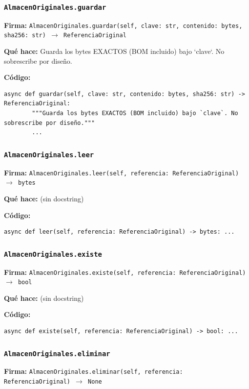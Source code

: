 \documentclass[11pt,a4paper]{article}
\begin{document}
\subsubsection*{\texttt{AlmacenOriginales.guardar}}
\textbf{Firma:} \texttt{AlmacenOriginales.guardar(self, clave: str, contenido: bytes, sha256: str) $\rightarrow$ ReferenciaOriginal}

\textbf{Qué hace:} Guarda los bytes EXACTOS (BOM incluido) bajo `clave`. No sobrescribe por diseño.

\textbf{Código:}
\begin{lstlisting}
async def guardar(self, clave: str, contenido: bytes, sha256: str) -> ReferenciaOriginal:
        """Guarda los bytes EXACTOS (BOM incluido) bajo `clave`. No sobrescribe por diseño."""
        ...
\end{lstlisting}

\subsubsection*{\texttt{AlmacenOriginales.leer}}
\textbf{Firma:} \texttt{AlmacenOriginales.leer(self, referencia: ReferenciaOriginal) $\rightarrow$ bytes}

\textbf{Qué hace:} (sin docstring)

\textbf{Código:}
\begin{lstlisting}
async def leer(self, referencia: ReferenciaOriginal) -> bytes: ...
\end{lstlisting}

\subsubsection*{\texttt{AlmacenOriginales.existe}}
\textbf{Firma:} \texttt{AlmacenOriginales.existe(self, referencia: ReferenciaOriginal) $\rightarrow$ bool}

\textbf{Qué hace:} (sin docstring)

\textbf{Código:}
\begin{lstlisting}
async def existe(self, referencia: ReferenciaOriginal) -> bool: ...
\end{lstlisting}

\subsubsection*{\texttt{AlmacenOriginales.eliminar}}
\textbf{Firma:} \texttt{AlmacenOriginales.eliminar(self, referencia: ReferenciaOriginal) $\rightarrow$ None}
\end{document}
